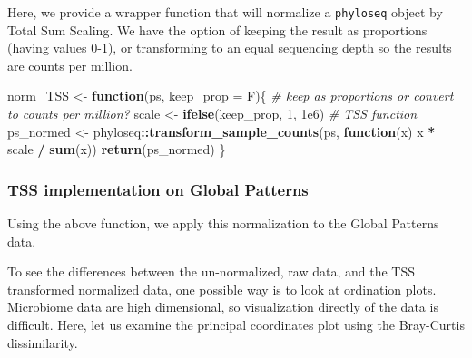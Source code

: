 \documentclass[
]{book}
\newenvironment{Shaded}{\begin{snugshade}}{\end{snugshade}}
\newcommand{\CommentTok}[1]{\textcolor[rgb]{0.56,0.35,0.01}{\textit{#1}}}
\newcommand{\ControlFlowTok}[1]{\textcolor[rgb]{0.13,0.29,0.53}{\textbf{#1}}}
\newcommand{\DataTypeTok}[1]{\textcolor[rgb]{0.13,0.29,0.53}{#1}}
\newcommand{\DecValTok}[1]{\textcolor[rgb]{0.00,0.00,0.81}{#1}}
\newcommand{\FloatTok}[1]{\textcolor[rgb]{0.00,0.00,0.81}{#1}}
\newcommand{\KeywordTok}[1]{\textcolor[rgb]{0.13,0.29,0.53}{\textbf{#1}}}
\newcommand{\NormalTok}[1]{#1}
\newcommand{\OperatorTok}[1]{\textcolor[rgb]{0.81,0.36,0.00}{\textbf{#1}}}
\newcommand{\StringTok}[1]{\textcolor[rgb]{0.31,0.60,0.02}{#1}}
\begin{document}
Here, we provide a wrapper function that will normalize a \texttt{phyloseq} object by Total Sum Scaling. We have the option of keeping the result as proportions (having values 0-1), or transforming to an equal sequencing depth so the results are counts per million.

\begin{Shaded}
\begin{Highlighting}[]
\NormalTok{norm\_TSS \textless{}{-}}\StringTok{ }\ControlFlowTok{function}\NormalTok{(ps, }\DataTypeTok{keep\_prop =}\NormalTok{ F)\{}
    \CommentTok{\# keep as proportions or convert to counts per million?}
\NormalTok{    scale \textless{}{-}}\StringTok{ }\KeywordTok{ifelse}\NormalTok{(keep\_prop, }\DecValTok{1}\NormalTok{, }\FloatTok{1e6}\NormalTok{)}
    \CommentTok{\# TSS function}
\NormalTok{    ps\_normed \textless{}{-}}\StringTok{ }\NormalTok{phyloseq}\OperatorTok{::}\KeywordTok{transform\_sample\_counts}\NormalTok{(ps, }\ControlFlowTok{function}\NormalTok{(x) x }\OperatorTok{*}\StringTok{ }\NormalTok{scale }\OperatorTok{/}\StringTok{ }\KeywordTok{sum}\NormalTok{(x))}
    \KeywordTok{return}\NormalTok{(ps\_normed)}
\NormalTok{\}}
\end{Highlighting}
\end{Shaded}

\hypertarget{tss-implementation-on-global-patterns}{%
\subsubsection{TSS implementation on Global Patterns}\label{tss-implementation-on-global-patterns}}

Using the above function, we apply this normalization to the Global Patterns data.

\begin{Shaded}
\end{Shaded}

To see the differences between the un-normalized, raw data, and the TSS transformed normalized data, one possible way is to look at ordination plots. Microbiome data are high dimensional, so visualization directly of the data is difficult. Here, let us examine the principal coordinates plot using the Bray-Curtis dissimilarity.
\end{document}
